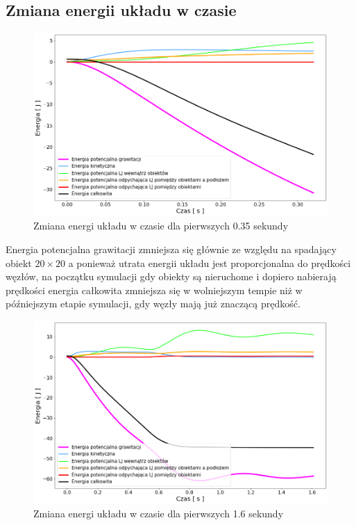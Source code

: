 \documentclass[12pt, letterpaper]{report}
\begin{document}
    \subsection{Zmiana energii układu w czasie}
    \begin{figure}[H]
        \centering
        \includegraphics[width=17cm]{pressure_energy02_01}
        \caption{
            Zmiana energi układu w czasie dla pierwszych 0.35 sekundy
        }
    \end{figure}
    
    Energia potencjalna grawitacji zmniejsza się głównie ze względu na spadający obiekt $20 \times 20$
    a ponieważ utrata energii układu jest proporcjonalna do prędkości węzłów, na początku symulacji gdy 
    obiekty są nieruchome i dopiero nabierają prędkości energia całkowita zmniejsza się w wolniejszym tempie niż 
    w późniejszym etapie symulacji, gdy węzły mają już znaczącą prędkość.

    \begin{figure}[H]
        \centering
        \includegraphics[width=17cm]{pressure_energy02_02}
        \caption{
            Zmiana energi układu w czasie dla pierwszych 1.6 sekundy
        }
    \end{figure}
\end{document}
